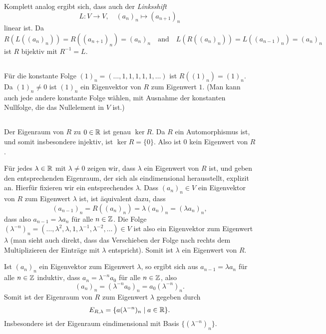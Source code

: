 \documentclass[a4paper,10pt]{article}
\begin{document}
Komplett analog ergibt sich, dass auch der \emph{Linksshift}
\[
 L \colon V \to V, \quad (a_n)_n \mapsto (a_{n+1})_n
\]
linear ist. Da
\[
 R(L((a_n)_n))
 = R((a_{n+1})_n)
 = (a_n)_n
 \quad\text{and}\quad
 L(R((a_n)_n))
 = L((a_{n-1})_n)
 = (a_n)_n
\]
ist $R$ bijektiv mit $R^{-1} = L$.


\subsection{}
Für die konstante Folge $(1)_n = (\dotsc,1,1,1,1,1,\dotsc)$ ist $R((1)_n) = (1)_n$. Da $(1)_n \neq 0$ ist $(1)_n$ ein Eigenvektor von $R$ zum Eigenwert $1$. (Man kann auch jede andere konstante Folge wählen, mit Ausnahme der konstanten Nullfolge, die das Nullelement in $V$ ist.)


\subsection{}
Der Eigenraum von $R$ zu $0 \in \mathbb{R}$ ist genau $\ker R$. Da $R$ ein Automorphismus ist, und somit insbesondere injektiv, ist $\ker R = \{0\}$. Also ist $0$ kein Eigenwert von $R$.

Für jedes $\lambda \in \mathbb{R}$ mit $\lambda \neq 0$ zeigen wir, dass $\lambda$ ein Eigenwert von $R$ ist, und geben den entsprechenden Eigenraum, der sich als eindimensional herausstellt, explizit an. Hierfür fixieren wir ein entsprechendes $\lambda$. Dass $(a_n)_n \in V$ ein Eigenvektor von $R$ zum Eigenwert $\lambda$ ist, ist äquivalent dazu, dass
\[
 (a_{n-1})_n
 = R((a_n)_n)
 = \lambda (a_n)_n
 = (\lambda a_n)_n,
\]
dass also $a_{n-1} = \lambda a_n$ für alle $n \in \mathbb{Z}$. Die Folge $(\lambda^{-n})_n = (\dotsc, \lambda^2, \lambda, 1, \lambda^{-1}, \lambda^{-2}, \dotsc) \in V$ ist also ein Eigenvektor zum Eigenwert $\lambda$ (man sieht auch direkt, dass das Verschieben der Folge nach rechts dem Multiplizieren der Einträge mit $\lambda$ entspricht). Somit ist $\lambda$ ein Eigenwert von $R$.

Ist $(a_n)_n$ ein Eigenvektor zum Eigenwert $\lambda$, so ergibt sich aus $a_{n-1} = \lambda a_n$ für alle $n \in \mathbb{Z}$ induktiv, dass $a_n = \lambda^{-n} a_0$ für alle $n \in \mathbb{Z}$, also
\[
 (a_n)_n = (\lambda^{-n} a_0)_n = a_0 (\lambda^{-n})_n.
\]
Somit ist der Eigenraum von $R$ zum Eigenwert $\lambda$ gegeben durch
\[
 E_{R,\lambda} = \{a (\lambda^{-n})_n \mid a \in \mathbb{R}\}.
\]
Insbesondere ist der Eigenraum eindimensional mit Basis $\{(\lambda^{-n})_n\}$.
\end{document}
